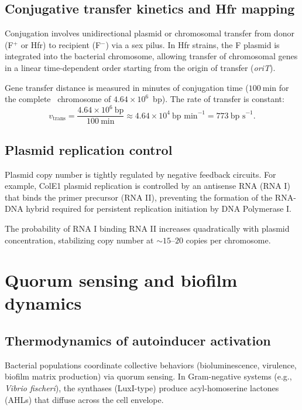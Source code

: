 \documentclass[12pt, a4paper, oneside]{report}
\begin{document}
\subsection{Conjugative transfer kinetics and Hfr mapping}

Conjugation involves unidirectional plasmid or chromosomal transfer from donor (F$^+$ or Hfr) to recipient (F$^-$) via a sex pilus. In Hfr strains, the F plasmid is integrated into the bacterial chromosome, allowing transfer of chromosomal genes in a linear time-dependent order starting from the origin of transfer (\textit{oriT}).

Gene transfer distance is measured in minutes of conjugation time ($100~\text{min}$ for the complete \Ecoli\ chromosome of $4.64 \times 10^6$~bp). The rate of transfer is constant:
\begin{equation}
  v_{\text{trans}} = \frac{4.64 \times 10^6~\text{bp}}{100~\text{min}} \approx 4.64 \times 10^4~\text{bp~min}^{-1} = 773~\text{bp~s}^{-1}.
  \label{eq:vtrans}
\end{equation}

\subsection{Plasmid replication control}

Plasmid copy number is tightly regulated by negative feedback circuits. For example, ColE1 plasmid replication is controlled by an antisense RNA (RNA I) that binds the primer precursor (RNA II), preventing the formation of the RNA-DNA hybrid required for persistent replication initiation by DNA Polymerase I.

The probability of RNA I binding RNA II increases quadratically with plasmid concentration, stabilizing copy number at $\sim 15$--$20$ copies per chromosome.

\section{Quorum sensing and biofilm dynamics}

\subsection{Thermodynamics of autoinducer activation}

Bacterial populations coordinate collective behaviors (bioluminescence, virulence, biofilm matrix production) via quorum sensing. In Gram-negative systems (e.g., \textit{Vibrio fischeri}), the synthases (LuxI-type) produce acyl-homoserine lactones (AHLs) that diffuse across the cell envelope.
\end{document}
